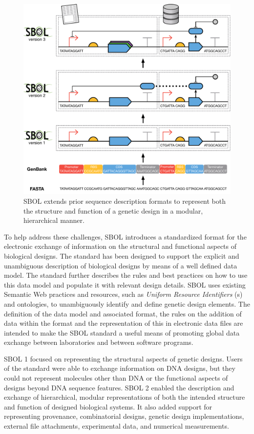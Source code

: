 \begin{figure}[htbp]
\centering
\includegraphics[width=\textwidth]{images/SBOL3-evolution.pdf}
\caption{SBOL extends prior sequence description formats to represent both the structure and function of a genetic design in a modular, hierarchical manner.}
\label{f:sequence}
\end{figure}

To help address these challenges, SBOL introduces a standardized format for the electronic exchange of information on the structural and functional aspects of biological designs. 
The standard has been designed to support the explicit and unambiguous description of biological designs by means of a well defined data model. 
The standard further describes the rules and best practices on how to use this data model and populate it with relevant design details. 
SBOL uses existing Semantic Web practices and resources, such as \emph{Uniform Resource Identifiers} (s) and ontologies, to unambiguously identify and define genetic design elements.
The definition of the data model and associated format, the rules on the addition of data within the format and the representation of this in electronic data files are intended to make the SBOL standard a useful means of promoting global data exchange between laboratories and between software programs.

SBOL 1 focused on representing the structural aspects of genetic designs. Users of the standard were able to exchange information on DNA designs, but they could not represent molecules other than DNA or the functional aspects of designs beyond DNA sequence features. SBOL 2 enabled the description and exchange of hierarchical, modular representations of both the intended structure and function of designed biological systems.  It also added support for representing provenance, combinatorial designs, genetic design implementations, external file attachments, experimental data, and numerical measurements. 

